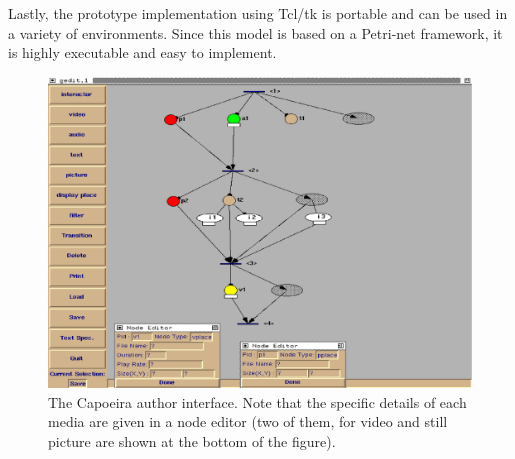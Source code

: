 \documentclass[twocolumn,10pt]{article}
\newcommand{\bib}{bibliography}
\begin{document}
Lastly, the prototype implementation using Tcl/tk is portable and can
be used in a variety of environments.  Since this model is based on a
Petri-net framework, it is highly executable and easy to implement.

\small




\onecolumn

\begin{figure}[bt]
    \centering
    \includegraphics[width=0.8\textheight]{figures/capoeira-prot.eps}%
    \caption{The Capoeira author interface.  Note that the specific details
of each media are given in a node editor (two of them, for 
video and still picture are shown at the bottom of the figure).}
    \label{fig-capoeira-prot}
\end{figure}
\vspace*{-0.5cm}
\textbf{\textit{}}
\end{document}

